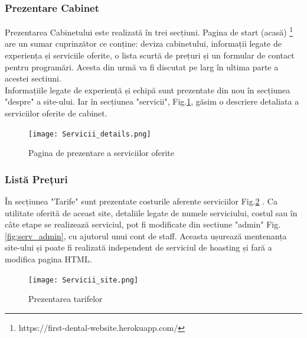 \documentclass[11pt]{scrartcl} %
\begin{document}

\subsubsection{Prezentare Cabinet}

Prezentarea Cabinetului este realizată în trei secțiuni. Pagina de start (acasă) \footnote{https://first-dental-website.herokuapp.com/} are un sumar cuprinzător ce conține: deviza cabinetului, informații legate de experiența și serviciile oferite, o lista scurtă de prețuri și un formular de contact pentru programări. Acesta din urmă va fi discutat pe larg în ultima parte a acestei sectiuni.\\
Informațiile legate de experiență și echipă sunt prezentate din nou în secțiunea "despre" a site-ului. Iar în secțiunea "servicii", Fig.\ref{fig:serv_details}, găsim o descriere detaliata a serviciilor oferite de cabinet. 

\begin{figure}[h] %
	\centering
	\texttt{[image: Servicii\_details.png]} %
	\caption{Pagina de prezentare a serviciilor oferite}
	\label{fig:serv_details}
\end{figure}



\subsubsection{Listă Prețuri}

În secțiunea "Tarife" sunt prezentate costurile aferente serviciilor Fig.\ref{fig:serv_site} . Ca utilitate oferită de aceast site, detaliile legate de numele serviciului, costul sau în câte etape se realizează serviciul, pot fi modificate din sectiune "admin" Fig.\ref{fig:serv_admin}, cu ajutorul unui cont de staff. Aceasta ușurează mentenanța site-ului și poate fi realizată independent de serviciul de hoasting și fară a modifica pagina HTML. 

\begin{figure}[h] %
	\centering
	\texttt{[image: Servicii\_site.png]} %
	\caption{Prezentarea tarifelor}
	\label{fig:serv_site}
\end{figure}
\end{document}

